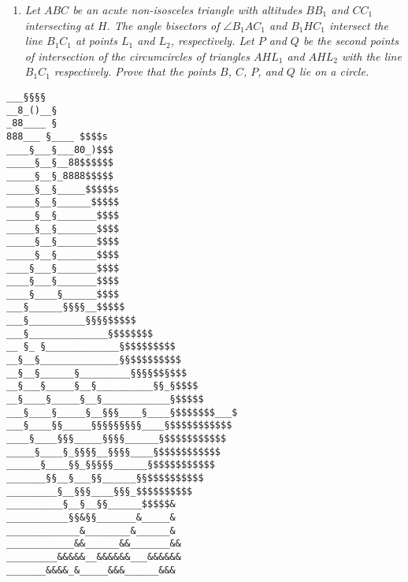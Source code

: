 \documentclass{article}
\begin{document}
\begin{enumerate}[1.]
\item %
{\itshape Let $ABC$ be an acute non-isosceles triangle with altitudes $BB_1$ and $CC_1$ intersecting at $H$.
The angle bisectors of $\angle B_1AC_1$ and $B_1HC_1$ intersect the line $B_1C_1$ at points $L_1$ and $L_2$, respectively.
Let $P$ and $Q$ be the second points of intersection of the circumcircles of triangles $AHL_1$ and $AHL_2$ with the line $B_1C_1$ respectively.
Prove that the points $B$, $C$, $P$, and $Q$ lie on a circle.}

\end{enumerate}

\vfill
\centering
\tiny
\begin{BVerbatim}
___§§§§
__8_()__§
_88____ §
888___ §____ $$$$s
____§___§___80_)$$$
_____§__§__88$$$$$$
_____§__§_8888$$$$$
_____§__§_____$$$$$s
_____§__§______$$$$$
_____§__§_______$$$$
_____§__§_______$$$$
_____§__§_______$$$$
_____§__§_______$$$$
____§___§_______$$$$
____§___§_______$$$$
____§____§______$$$$
___§______§§§§__$$$$$
___§__________§§§§$$$$$
___§______________§$$$$$$$
__ §_ §_____________§$$$$$$$$$
__§__§______________§§$$$$$$$$$
__§__§______§_________§§§§$$§$$$
__§___§_____§__§__________§§_§$$$$
__§____§_____§__§____________§$$$$$
___§____§_____§__§§§____§____§$$$$$$$___$
___§____§§_____§§§§§§§§§____§$$$$$$$$$$$
____§____§§§_____§§§§______§$$$$$$$$$$$
_____§____§_§§§§__§§§§____§$$$$$$$$$$$
______§____§§_§§§§§______§$$$$$$$$$$$
_______§§__§___§§______§§$$$$$$$$$$
_________§__§§§____§§§_$$$$$$$$$$
__________§__§__§§______$$$$$&
___________§§&§§_______&_____&
_____________&________&______&
____________&&______&&_______&&
_________&&&&&__&&&&&&___&&&&&&
_______&&&&_&_____&&&______&&&
\end{BVerbatim}
\end{document}
